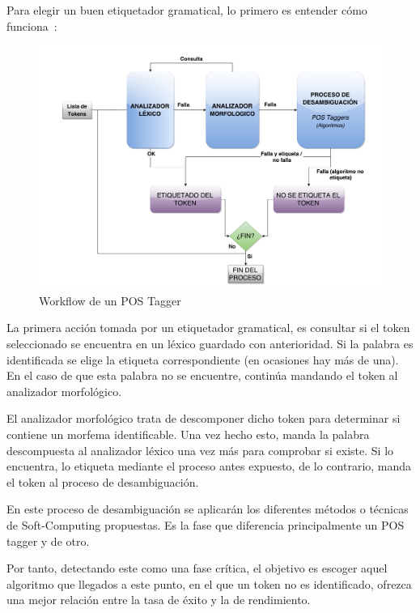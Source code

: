 \documentclass[runningheads,a4paper]{llncs}
\theoremstyle{break}
\begin{document}
\pagebreak

Para elegir un buen etiquetador gramatical, lo primero es entender cómo funciona~\cite{postagger:1}:

\begin{figure}
    \includegraphics[width=1.0\textwidth]{img/postagger_workflow.pdf}
    \caption[Workflow de un POS Tagger]{Workflow de un POS Tagger}
    \label{fig:postagger_workflow}
\end{figure}

La primera acción tomada por un etiquetador gramatical, es consultar si el token seleccionado se encuentra en un léxico guardado con anterioridad. Si la palabra es identificada se elige la etiqueta correspondiente (en ocasiones hay más de una). En el caso de que esta palabra no se encuentre, continúa mandando el token al analizador morfológico.

El analizador morfológico trata de descomponer dicho token para determinar si contiene un morfema identificable. Una vez hecho esto, manda la palabra descompuesta al analizador léxico una vez más para comprobar si existe. Si lo encuentra, lo etiqueta mediante el proceso antes expuesto, de lo contrario, manda el token al proceso de desambiguación.

En este proceso de desambiguación se aplicarán los diferentes métodos o técnicas de Soft-Computing propuestas. Es la fase que diferencia principalmente un POS tagger y de otro. 

\pagebreak
Por tanto, detectando este como una fase crítica, el objetivo es escoger aquel algoritmo que llegados a este punto, en el que un token no es identificado, ofrezca una mejor relación entre la tasa de éxito y la de rendimiento. 
\end{document}
